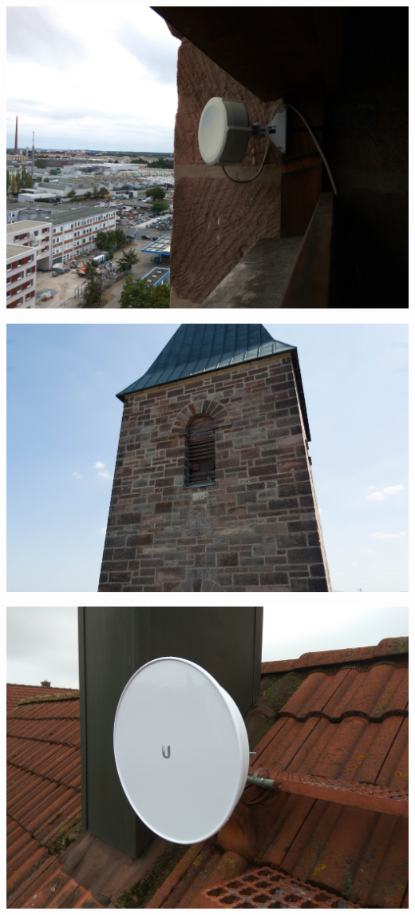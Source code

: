 \documentclass{beamer}
\begin{document}
	\begin{frame}
		\includegraphics[width=\framewidth]{media/p2p-sxt.jpg}
	\end{frame}
	\begin{frame}
		\includegraphics[width=\framewidth]{media/p2p-stmarkus.jpg}
	\end{frame}
	\begin{frame}
		\includegraphics[width=\framewidth]{media/p2p-wohnhaus.jpg}
	\end{frame}
\end{document}
